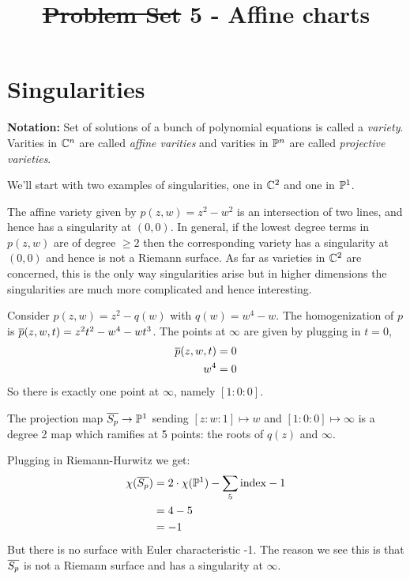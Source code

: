 \documentclass{article}
\begin{document}
  \title{\sout{Problem Set} 5 - Affine charts}
  \date{}
  \maketitle






\section{Singularities}
\textbf{Notation:} Set of solutions of a bunch of polynomial equations is called a \emph{variety}. Varities in $\mathbb{C}^n$ are called \emph{affine varities} and varities in $\mathbb{P}^n$ are called \emph{projective varieties}.

We'll start with two examples of singularities, one in $\mathbb{C}^2$ and one in $\mathbb{P}^1$.

\begin{ex}
  The affine variety given by $p(z,w) = z^2 - w^2$ is an intersection of two lines, and hence has a singularity at $(0,0)$.
  In general, if the lowest degree terms in $p(z,w)$ are of degree $\ge 2$ then the corresponding variety has a singularity at $(0,0)$ and hence is not a Riemann surface.
  As far as varieties in $\mathbb{C}^2$ are concerned, this is the only way singularities arise but in higher dimensions the singularities are much more complicated and hence interesting.
\end{ex}

\begin{ex}
  Consider $p(z,w) = z^2 - q(w)$ with $q(w) = w^4 - w$.
  The homogenization of $p$ is $\overline{p}(z,w,t) = z^2 t^2 - w^4 - w t^3$.
  The points at $\infty$ are given by plugging in $t = 0$,
  \begin{align*}
    \overline{p}(z,w,t) &= 0 \\
    w^4 &= 0
  \end{align*}
  So there is exactly one point at $\infty$, namely $[1:0:0]$.

  The projection map $\overline{S_p} \rightarrow \mathbb{P}^1$ sending $[z:w:1] \mapsto w$ and $[1:0:0] \mapsto \infty$ is a degree 2 map which ramifies at 5 points: the roots of $q(z)$ and $\infty$.

  Plugging in Riemann-Hurwitz we get:
  \begin{align*}
    \chi(\overline{S_p})
    &= 2 \cdot \chi(\mathbb{P}^1) - \sum_{5}\mathrm{index} - 1 \\
    &= 4 - 5 \\
    &= -1
  \end{align*}
  But there is no surface with Euler characteristic -1.
  The reason we see this is that $\overline{S_p}$ is not a Riemann surface and has a singularity at $\infty$.
\end{ex}
\end{document}
